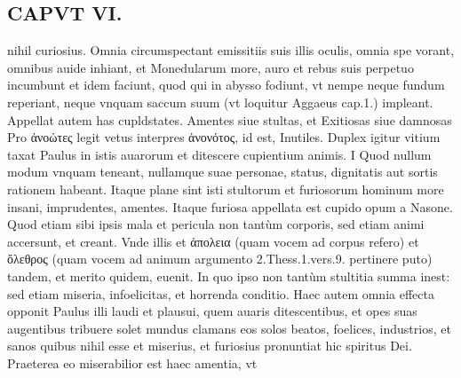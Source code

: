 \documentclass{article}
\begin{document}
\begin{pages}
\section*{CAPVT  VI. }
\marginpar{[ p.451 ]}\pstart nihil curiosius. Omnia circumspectant emissitiis suis illis oculis, omnia spe vorant, omnibus auide inhiant, et Monedularum more, auro et rebus suis perpetuo incumbunt et idem faciunt, quod qui in abysso fodiunt, vt nempe neque fundum reperiant, neque vnquam saccum suum (vt loquitur Aggaeus cap.1.) impleant.  \pend\pstart Appellat autem has cupldstates. Amentes siue stultas, et Exitiosas siue damnosas Pro ἀνοώτες legit vetus interpres ἀνονότος, id est, Inutiles.  \pend\pstart Duplex igitur vitium taxat Paulus in istis auarorum et ditescere cupientium animis. I Quod nullum modum vnquam teneant, nullamque suae personae, status, dignitatis aut sortis rationem habeant. Itaque plane sint isti stultorum et furiosorum hominum more insani, imprudentes, amentes. Itaque  furiosa appellata est cupido opum a Nasone.  \pend{} Quod etiam sibi ipsis mala et pericula non tantùm corporis, sed etiam animi accersunt, et creant. Vnde illis et ἀπολεια (quam vocem ad corpus refero) et ὄλεθρος (quam vocem ad animum argumento 2.Thess.1.vers.9. pertinere puto) tandem, et merito quidem, euenit. In quo ipso non tantùm stultitia summa inest: sed etiam miseria, infoelicitas, et horrenda conditio.  \pend\pstart Haec autem omnia effecta opponit Paulus illi laudi et plausui, quem auaris ditescentibus, et opes suas augentibus tribuere solet mundus clamans eos solos beatos, foelices, industrios, et sanos quibus nihil esse et miserius, et furiosius pronuntiat hic spiritus Dei.  \pend\pstart Praeterea eo miserabilior est haec amentia, vt  \pend

\end{pages}
\end{document}
